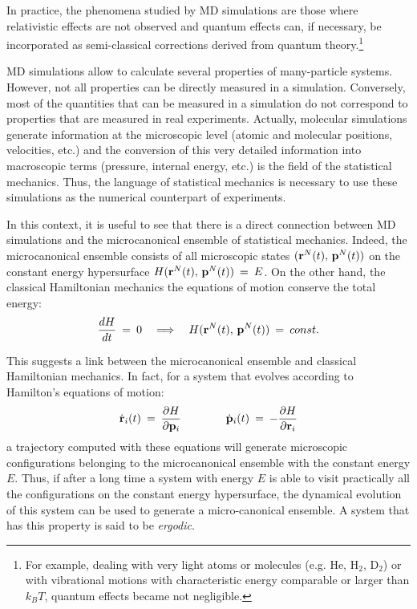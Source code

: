 In practice, the phenomena studied by MD simulations are those where relativistic effects are not observed and quantum effects can, if necessary, be incorporated as semi-classical corrections derived from quantum theory.\footnote{For example, dealing with very light atoms or molecules (e.g. He, H$_2$, D$_2$) or with vibrational motions with characteristic energy comparable or larger than $k_B T$, quantum effects became not negligible.}

MD simulations allow to calculate several properties of many-particle systems. However, not all properties can be directly measured in a simulation. Conversely, most of the quantities that can be measured in a simulation do not correspond to properties that are measured in real experiments.
Actually, molecular simulations generate information at the microscopic level (atomic and molecular positions, velocities, etc.) and the conversion of this very detailed information into macroscopic terms (pressure, internal energy, etc.) is the field of the statistical mechanics. Thus, the language of statistical mechanics is necessary to use these simulations as the numerical counterpart of experiments.

In this context, it is useful to see that there is a direct connection between MD simulations and the microcanonical ensemble of statistical mechanics. Indeed, the microcanonical ensemble consists of all microscopic states $( \bold{r}^N(t), \, \bold{p}^N(t) )$  on the constant energy hypersurface $H (\bold{r}^N(t) , \, \bold{p}^N(t)) \:=\: E$.
On the other hand, the classical Hamiltonian mechanics the equations of motion conserve the total energy: 
\begin{equation}\label{eq:hamilton-energy_cons}
\frac{dH}{dt} \:=\: 0 \quad \Longrightarrow \quad H ( \bold{r}^N(t), \, \bold{p}^N(t) ) \:=\: const.
\end{equation}

This suggests a link between the microcanonical ensemble and classical Hamiltonian mechanics. In fact, for a system that evolves according to Hamilton's equations of motion:
\begin{equation}\label{eq:hamilton}
\dot{\bold{r}}_i(t) \:=\: \frac{\partial H}{\partial \bold{p}_i} \qquad \qquad \dot{\bold{p}}_i(t) \:=\: - \frac{\partial H}{\partial \bold{r}_i}
\end{equation}
a trajectory computed with these equations will generate microscopic configurations belonging to the microcanonical ensemble with the constant energy $E$. Thus, if after a long time a system with energy $E$ is able to visit practically all the configurations on the constant energy hypersurface, the dynamical evolution of this system can be used to generate a micro-canonical ensemble. A system that has this property is said to be \textit{ergodic}.


